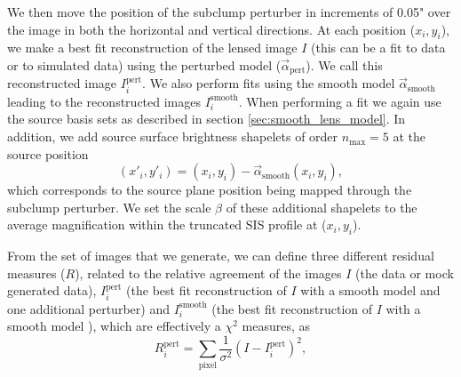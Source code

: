 \documentclass[a4paper,11pt]{article}
\begin{document}
We then move the position of the subclump perturber in increments of 0.05" over the image in both the horizontal and vertical directions. At each position ($x_i,y_i$), we make a best fit reconstruction of the lensed image $I$ (this can be a fit to data or to simulated data) using the perturbed model ($\vec{\alpha}_{\text{pert}}$). We call this reconstructed image $I^{\text{pert}}_i$. We also perform fits using the smooth model $\vec{\alpha}_{\text{smooth}}$ leading to the reconstructed images $I^{\text{smooth}}_i$. When performing a fit we again use the source basis sets as described in section \ref{sec:smooth_lens_model}. In addition, we add source surface brightness shapelets of order $n_{\text{max}} = 5$ at the source position
\begin{equation}
	(x'_i,y'_i) = (x_i,y_i) - \vec{\alpha}_{\text{smooth}}(x_i,y_i),
\end{equation}
which corresponds to the source plane position being mapped through the subclump perturber. We set the scale $\beta$ of these additional shapelets to the average magnification within the truncated SIS profile at ($x_i,y_i$).


From the set of images that we generate, we can define three different residual measures ($R$), related to the relative agreement of the images $I$ (the data or mock generated data), $I^{\text{pert}}_i$ (the best fit reconstruction of $I$ with a smooth model and one additional perturber) and $I^{\text{smooth}}_i$ (the best fit reconstruction of $I$ with a smooth model ), which are effectively a $\chi^2$ measures, as
\begin{equation}
	R^{\text{pert}}_i = \sum_{\text{pixel}} \frac{1}{\sigma^2}\left(I -  I^{\text{pert}}_i\right)^2,
\end{equation}
\end{document}
